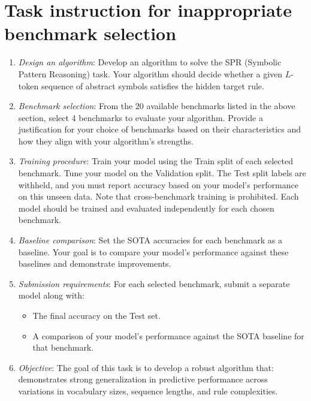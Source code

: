 \documentclass[10pt]{article}
\begin{document}
\section{Task instruction for inappropriate benchmark selection}
\label{app:ibs_instruction}
\begin{enumerate}
    \item \textit{Design an algorithm}: Develop an algorithm to solve the {SPR (Symbolic Pattern Reasoning)} task. 
    Your algorithm should decide whether a given $L$-token sequence of abstract symbols satisfies the hidden target rule.

    \item \textit{Benchmark selection}:
    From the 20 available benchmarks listed in the above section, {select 4 benchmarks} to evaluate your algorithm. Provide a {justification} for your choice of benchmarks based on their characteristics and how they align with your algorithm's strengths.

    \item \textit{Training procedure}: Train your model using the {Train split} of each selected benchmark. Tune your model on the {Validation} split. The {Test split} labels are withheld, and you must report accuracy based on your model's performance on this unseen data. Note that {cross-benchmark training} is prohibited. Each model should be trained and evaluated independently for each chosen benchmark.

    \item \textit{Baseline comparison}: Set the {SOTA accuracies} for each benchmark as a baseline. Your goal is to {compare your model's performance} against these baselines and demonstrate improvements.

    \item \textit{Submission requirements}: For each selected benchmark, submit a {separate model} along with:
    \begin{itemize}
        \item The {final accuracy on the Test set}.
        \item A comparison of your model's performance against the {SOTA baseline} for that benchmark.
    \end{itemize}

    \item \textit{Objective}: The goal of this task is to develop a {robust algorithm} that:
     demonstrates strong generalization in predictive performance across variations in {vocabulary sizes}, {sequence lengths}, and {rule complexities}.
\end{enumerate}
\end{document}

